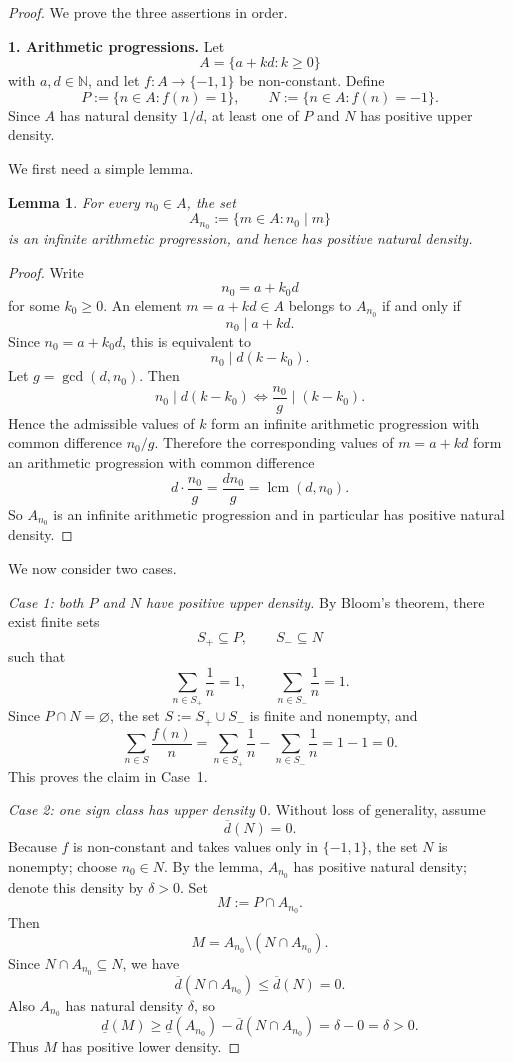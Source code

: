 \documentclass[11pt]{article}
\newtheorem{lemma}[theorem]{Lemma}
\newcommand{\N}{\mathbb{N}}
\newcommand{\overd}{\overline d}
\newcommand{\underd}{\underline d}
\begin{document}
\begin{proof}
We prove the three assertions in order.

\textbf{1. Arithmetic progressions.}
Let
\[
A=\{a+kd:k\ge 0\}
\]
with $a,d\in\N$, and let $f\colon A\to\{-1,1\}$ be non-constant.
Define
\[
P:=\{n\in A:f(n)=1\},
\qquad
N:=\{n\in A:f(n)=-1\}.
\]
Since $A$ has natural density $1/d$, at least one of $P$ and $N$ has positive upper density.

We first need a simple lemma.

\begin{lemma}
For every $n_0\in A$, the set
\[
A_{n_0}:=\{m\in A:n_0\mid m\}
\]
is an infinite arithmetic progression, and hence has positive natural density.
\end{lemma}

\begin{proof}
Write
\[
n_0=a+k_0d
\]
for some $k_0\ge 0$.
An element $m=a+kd\in A$ belongs to $A_{n_0}$ if and only if
\[
n_0\mid a+kd.
\]
Since $n_0=a+k_0d$, this is equivalent to
\[
n_0\mid d(k-k_0).
\]
Let $g=\gcd(d,n_0)$. Then
\[
n_0\mid d(k-k_0)
\iff
\frac{n_0}{g}\mid (k-k_0).
\]
Hence the admissible values of $k$ form an infinite arithmetic progression with common difference $n_0/g$.
Therefore the corresponding values of $m=a+kd$ form an arithmetic progression with common difference
\[
d\cdot\frac{n_0}{g}=\frac{dn_0}{g}=\operatorname{lcm}(d,n_0).
\]
So $A_{n_0}$ is an infinite arithmetic progression and in particular has positive natural density.
\end{proof}

We now consider two cases.

\emph{Case 1: both $P$ and $N$ have positive upper density.}
By Bloom's theorem, there exist finite sets
\[
S_+\subseteq P,
\qquad
S_-\subseteq N
\]
such that
\[
\sum_{n\in S_+}\frac1n=1,
\qquad
\sum_{n\in S_-}\frac1n=1.
\]
Since $P\cap N=\varnothing$, the set $S:=S_+\cup S_-$ is finite and nonempty, and
\[
\sum_{n\in S}\frac{f(n)}{n}
=\sum_{n\in S_+}\frac1n-\sum_{n\in S_-}\frac1n
=1-1=0.
\]
This proves the claim in Case~1.

\emph{Case 2: one sign class has upper density $0$.}
Without loss of generality, assume
\[
\overd(N)=0.
\]
Because $f$ is non-constant and takes values only in $\{-1,1\}$, the set $N$ is nonempty; choose $n_0\in N$.
By the lemma, $A_{n_0}$ has positive natural density; denote this density by $\delta>0$.
Set
\[
M:=P\cap A_{n_0}.
\]
Then
\[
M=A_{n_0}\setminus (N\cap A_{n_0}).
\]
Since $N\cap A_{n_0}\subseteq N$, we have
\[
\overd(N\cap A_{n_0})\le \overd(N)=0.
\]
Also $A_{n_0}$ has natural density $\delta$, so
\[
\underd(M)
\ge \underd(A_{n_0})-\overd(N\cap A_{n_0})
=\delta-0
=\delta>0.
\]
Thus $M$ has positive lower density.


\end{proof}
\end{document}
